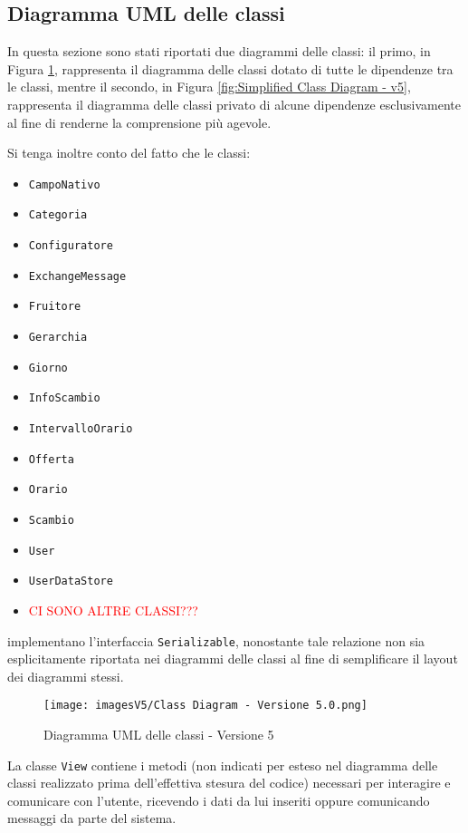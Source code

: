 \subsection{Diagramma UML delle classi}
In questa sezione sono stati riportati due diagrammi delle classi: il primo, in Figura \ref{fig:Class Diagram - v5}, rappresenta il diagramma delle classi dotato di tutte le dipendenze tra le classi, mentre il secondo, in Figura \ref{fig:Simplified Class Diagram - v5}, rappresenta il diagramma delle classi privato di alcune dipendenze esclusivamente al fine di renderne la comprensione più agevole.

Si tenga inoltre conto del fatto che le classi:
\begin{itemize}
    \item \texttt{CampoNativo}
    \item \texttt{Categoria}
    \item \texttt{Configuratore}
    \item \texttt{ExchangeMessage}
    \item \texttt{Fruitore}
    \item \texttt{Gerarchia}
    \item \texttt{Giorno}
    \item \texttt{InfoScambio}
    \item \texttt{IntervalloOrario}
    \item \texttt{Offerta}
    \item \texttt{Orario}
    \item \texttt{Scambio}
    \item \texttt{User}
    \item \texttt{UserDataStore}
    \item \textcolor{red}{CI SONO ALTRE CLASSI???}
\end{itemize}
implementano l'interfaccia \texttt{Serializable}, nonostante tale relazione non sia esplicitamente riportata nei diagrammi delle classi al fine di semplificare il layout dei diagrammi stessi.

\begin{figure}[h!]
    \centering
    \texttt{[image: imagesV5/Class Diagram - Versione 5.0.png]}
    \caption{\label{fig:Class Diagram - v5}Diagramma UML delle classi - Versione 5}
\end{figure} 

La classe \texttt{View} contiene i metodi (non indicati per esteso nel diagramma delle classi realizzato prima dell'effettiva stesura del codice) necessari per interagire e comunicare con l'utente, ricevendo i dati da lui inseriti oppure comunicando messaggi da parte del sistema.

